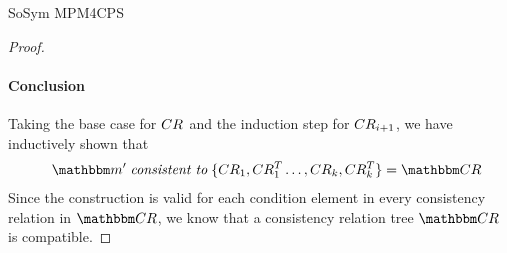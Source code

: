 \begin{copiedFrom}{SoSym MPM4CPS}
\begin{proof}
    \paragraph{Conclusion}
    Taking the base case for $CR_{}$ and the induction step for $CR_{i+1}$, we have inductively shown that 
    \begin{align*}
        \formulaskip 
        \modelset{m'} \consistenttomath \setted{\consistencyrelation{CR}{1}, \consistencyrelation{CR^T}{1} \dots, \consistencyrelation{CR}{k}, \consistencyrelation{CR^T}{k}} = \consistencyrelationset{CR}
    \end{align*}
    Since the construction is valid for each condition element in every consistency relation in $\consistencyrelationset{CR}$, we know that a consistency relation tree $\consistencyrelationset{CR}$ is compatible.
    

\end{proof}
\end{copiedFrom}
